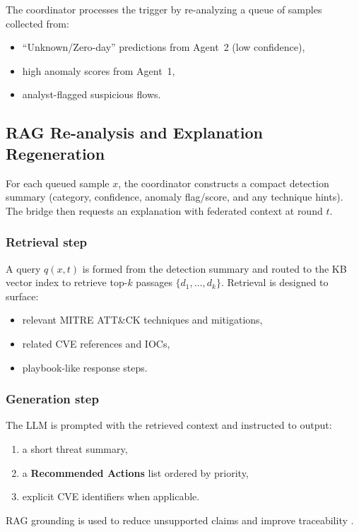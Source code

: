 The coordinator processes the trigger by re-analyzing a queue of samples collected from:
\begin{itemize}
  \item ``Unknown/Zero-day'' predictions from Agent~2 (low confidence),
  \item high anomaly scores from Agent~1,
  \item analyst-flagged suspicious flows.
\end{itemize}

\subsection{RAG Re-analysis and Explanation Regeneration}
\label{sec:rag-reanalysis}

For each queued sample $x$, the coordinator constructs a compact detection summary (category, confidence, anomaly flag/score, and any technique hints). The bridge then requests an explanation with federated context at round $t$.

\subsubsection{Retrieval step}
A query $q(x,t)$ is formed from the detection summary and routed to the KB vector index to retrieve top-$k$ passages $\{d_1,\dots,d_k\}$. Retrieval is designed to surface:
\begin{itemize}
  \item relevant MITRE ATT\&CK techniques and mitigations,
  \item related CVE references and IOCs,
  \item playbook-like response steps.
\end{itemize}

\subsubsection{Generation step}
The LLM is prompted with the retrieved context and instructed to output:
\begin{enumerate}
  \item a short threat summary,
  \item a \textbf{Recommended Actions} list ordered by priority,
  \item explicit CVE identifiers when applicable.
\end{enumerate}
RAG grounding is used to reduce unsupported claims and improve traceability \cite{lewis2020rag}.

